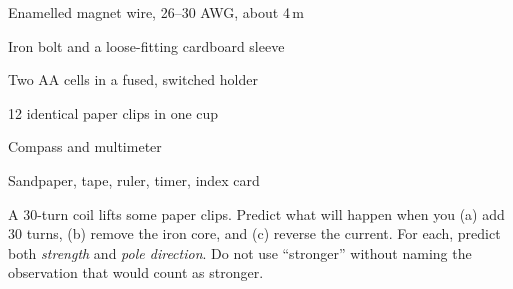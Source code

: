 



\begin{materials}
\item Enamelled magnet wire, 26--30 AWG, about 4\,m
\item Iron bolt and a loose-fitting cardboard sleeve
\item Two AA cells in a fused, switched holder
\item 12 identical paper clips in one cup
\item Compass and multimeter
\item Sandpaper, tape, ruler, timer, index card
\end{materials}

\begin{predict}
A \(30\)-turn coil lifts some paper clips. Predict what will happen when you
(a) add \(30\) turns, (b) remove the iron core, and (c) reverse the current.
For each, predict both \emph{strength} and \emph{pole direction}. Do not use
``stronger'' without naming the observation that would count as stronger.
\end{predict}


